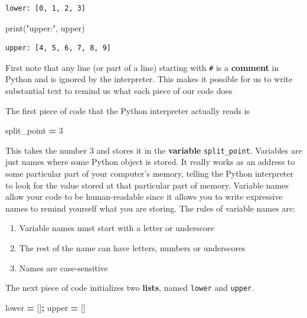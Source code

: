 \documentclass[
  letterpaper,
]{scrbook}
\newenvironment{Shaded}{\begin{snugshade}}{\end{snugshade}}
\newcommand{\BuiltInTok}[1]{#1}
\newcommand{\DecValTok}[1]{\textcolor[rgb]{0.00,0.00,0.81}{#1}}
\newcommand{\NormalTok}[1]{#1}
\newcommand{\OperatorTok}[1]{\textcolor[rgb]{0.81,0.36,0.00}{\textbf{#1}}}
\newcommand{\StringTok}[1]{\textcolor[rgb]{0.31,0.60,0.02}{#1}}
\providecommand{\tightlist}{%
  \setlength{\itemsep}{0pt}\setlength{\parskip}{0pt}}
\begin{document}
\begin{verbatim}
lower: [0, 1, 2, 3]
\end{verbatim}

\begin{Shaded}
\begin{Highlighting}[]
\BuiltInTok{print}\NormalTok{(}\StringTok{"upper:"}\NormalTok{, upper)}
\end{Highlighting}
\end{Shaded}

\begin{verbatim}
upper: [4, 5, 6, 7, 8, 9]
\end{verbatim}

First note that any line (or part of a line) starting with \texttt{\#} is a \textbf{comment} in Python and is ignored by the interpreter. This makes it possible for us to write substantial text to remind us what each piece of our code does

The first piece of code that the Python interpreter actually reads is

\begin{Shaded}
\begin{Highlighting}[]
\NormalTok{split_point }\OperatorTok{=} \DecValTok{3}
\end{Highlighting}
\end{Shaded}

This takes the number 3 and stores it in the \textbf{variable} \texttt{split\_point}. Variables are just names where some Python object is stored. It really works as an address to some particular part of your computer's memory, telling the Python interpreter to look for the value stored at that particular part of memory. Variable names allow your code to be human-readable since it allows you to write expressive names to remind yourself what you are storing. The rules of variable names are:

\begin{enumerate}
\def\labelenumi{\arabic{enumi}.}
\tightlist
\item
  Variable names must start with a letter or underscore
\item
  The rest of the name can have letters, numbers or underscores
\item
  Names are case-sensitive
\end{enumerate}

The next piece of code initializes two \textbf{lists}, named \texttt{lower} and \texttt{upper}.

\begin{Shaded}
\begin{Highlighting}[]
\NormalTok{lower }\OperatorTok{=}\NormalTok{ []}\OperatorTok{;}\NormalTok{ upper }\OperatorTok{=}\NormalTok{ []}
\end{Highlighting}
\end{Shaded}
\end{document}
